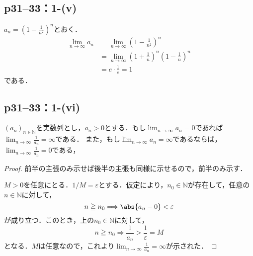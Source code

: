 \subsection*{p31--33：1-(v)}
\begin{tanswer}
    $a_n =\left (1-\frac{1}{n^2}\right)^n$とおく．
    \begin{align*}
        \lim_{n \to \infty} a_n & =\lim_{n \to \infty} \left (1-\frac{1}{n^2}\right)^n                              \\
                                & = \lim_{n \to \infty} \left (1+\frac{1}{n}\right)^n \left (1-\frac{1}{n}\right)^n \\
                                & = e \cdot \frac{1}{e} =1
    \end{align*}
    である．
\end{tanswer}

\subsection*{p31--33：1-(vi)}

\begin{lemma}{}{}

    $(a_n)_{n \in \mathbb{N}}$を実数列とし，$a_n > 0$とする．もし$\lim_{n \to \infty} a_n =0$であれば$\lim_{n \to \infty} \frac{1}{a_n}=\infty$である．
    また，もし$\lim_{n \to \infty} a_n =\infty$であるならば，$\lim_{n \to \infty} \frac{1}{a_n} =0$である，

\end{lemma}

\begin{proof}
    前半の主張のみ示せば後半の主張も同様に示せるので，前半のみ示す．

    $M>0$を任意にとる．$1/M = \varepsilon$とする．仮定により，$n_0 \in \mathbb{N}$が存在して，任意の$n \in \mathbb{N}$に対して，
    \[
        n \geqq n_0 \Longrightarrow \abs{a_n-0}<\varepsilon
    \]
    が成り立つ．このとき，上の$n_0 \in \mathbb{N}$に対して，
    \[
        n \geqq n_0 \Longrightarrow \frac{1}{a_n} >\frac{1}{\varepsilon}=M
    \]
    となる．$M$は任意なので，これより$\lim_{n \to \infty} \frac{1}{a_n}=\infty$が示された．
\end{proof}


